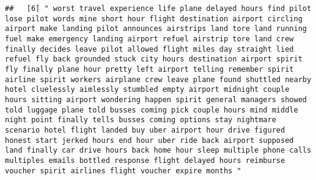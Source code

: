 \documentclass[
]{article}
\begin{document}
\begin{verbatim}
##   [6] " worst travel experience life plane delayed hours find pilot lose pilot words mine short hour flight destination airport circling airport make landing pilot announces airstrips land tore land running fuel make emergency landing airport refuel airstrip tore land crew finally decides leave pilot allowed flight miles day straight lied refuel fly back grounded stuck city hours destination airport spirit fly finally plane hour pretty left airport telling remember spirit airline spirit workers airplane crew leave plane found shuttled nearby hotel cluelessly aimlessly stumbled empty airport midnight couple hours sitting airport wondering happen spirit general managers showed told luggage plane told busses coming pick couple hours mind middle night point finally tells busses coming options stay nightmare scenario hotel flight landed buy uber airport hour drive figured honest start jerked hours end hour uber ride back airport supposed land finally car drive hours back home hour sleep multiple phone calls multiples emails bottled response flight delayed hours reimburse voucher spirit airlines flight voucher expire months "                                                                                                                                                                                                                                                                                                                                                                                                                                                                                                                                                                                                                     

\end{verbatim}
\end{document}
